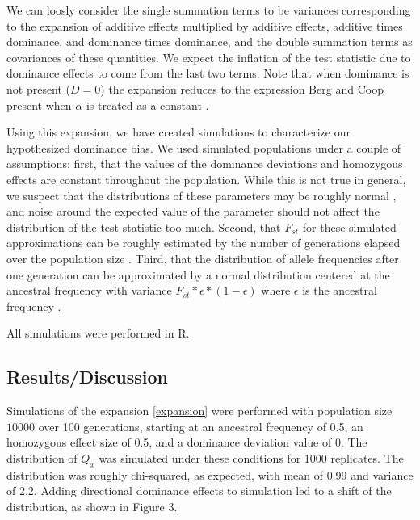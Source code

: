 \documentclass[a4paper,12pt]{article}
\begin{document}
We can loosly consider the single summation terms to be variances
corresponding to the expansion of additive effects multiplied by
additive effects, additive times dominance, and dominance times
dominance, and the double summation terms as covariances of these
quantities. We expect the inflation of the test statistic due to
dominance effects to come from the last two terms. Note that when
dominance is not present ($D=0$) the expansion reduces to the
expression Berg and Coop present when $\alpha$ is treated as a constant
\cite{berg}.

Using this expansion, we have created simulations to characterize our
hypothesized dominance bias. We used simulated populations
under a couple of assumptions: first, that the values of the dominance
deviations and homozygous effects are constant throughout the
population. While this is not true in general, we suspect that the
distributions of these parameters may be roughly normal
\cite{normaldist}, and noise around the expected value of the
parameter should not affect the distribution of the test statistic too
much. Second, that $F_{st}$ for these simulated approximations
can be roughly estimated by the number of generations elapsed over the
population size \cite{Fstest}. Third, that the distribution of allele frequencies after
one generation can be approximated by a normal distribution centered
at the ancestral frequency with variance
$F_{st}*\epsilon*(1-\epsilon)$ where $\epsilon$ is the ancestral
frequency \cite{gillespie}.

All simulations were performed in R. 

\subsection*{Results/Discussion}
Simulations of the expansion \eqref{expansion} were performed with
population size $10000$ over 100 generations, starting at an ancestral
frequency of 0.5, an homozygous effect size of 0.5, and a dominance
deviation value of 0. The distribution of $Q_x$ was simulated under
these conditions for 1000 replicates. The distribution was roughly
chi-squared, as expected, with mean of 0.99 and variance of
2.2. Adding directional dominance effects to simulation led to a shift of the
distribution, as shown in Figure 3.
\end{document}
